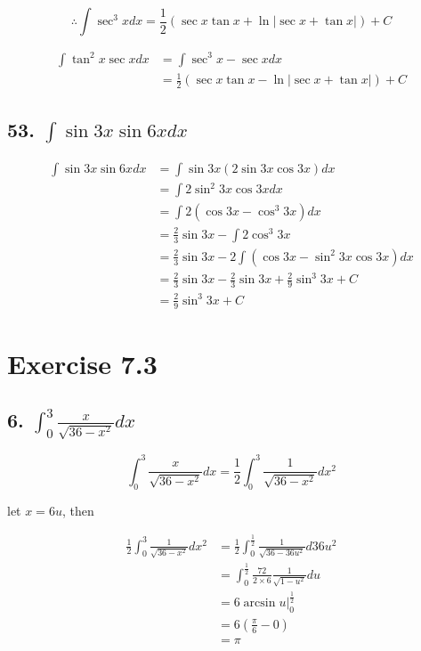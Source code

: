 \documentclass{article}
\begin{document}
    $$\therefore \int \sec^3 x dx = \frac 1 2 (\sec x \tan x + \ln |\sec x + \tan x|) + C$$

    $$\begin{aligned}
        \int \tan^2 x \sec x dx &= \int \sec ^3 x - \sec x dx \\
        &= \frac 1 2(\sec x \tan x - \ln |\sec x + \tan x|) + C
    \end{aligned}$$

    \subsection*{53. $\int \sin 3x \sin 6x dx$}

    $$\begin{aligned}
        \int \sin 3x \sin 6x dx &= \int \sin 3x(2\sin 3x \cos 3x) dx\\
        &= \int 2\sin^2 3x \cos 3x dx\\
        &= \int 2(\cos 3x - \cos ^3 3x) dx \\
        &= \frac 2 3 \sin 3x - \int 2\cos^3 3x \\
        &= \frac 2 3 \sin 3x - 2\int (\cos 3x - \sin^2 3x \cos 3x) dx \\
        &= \frac 2 3 \sin 3x - \frac 2 3 \sin 3x + \frac 2 9 \sin^3 3x + C \\
        &= \frac 2 9 \sin ^3 3x + C
    \end{aligned}$$

    \section*{Exercise 7.3}

    \subsection*{6. $\int_0^3\frac{x}{\sqrt{36 - x^2}} dx$}

    $$\int_0^3\frac{x}{\sqrt{36 - x^2}}dx = \frac 1 2 \int_0^3 \frac{1}{\sqrt{36 - x^2}}dx^2$$

    let $x = 6u$, then

    $$\begin{aligned}
        \frac 1 2 \int_0^3 \frac{1}{\sqrt{36 - x^2}}dx^2 &= \frac 1 2 \int_0^{\frac 1 2}\frac{1}{\sqrt{36 - 36u^2}} d 36u^2 \\
        &= \int_0^{\frac 1 2 }\frac{72}{2 \times 6}\frac{1}{\sqrt{1 - u^2}} du \\
        &= 6\arcsin u \biggl|_0^{\frac 1 2} \\
        &= 6(\frac \pi 6 - 0) \\
        &= \pi
    \end{aligned}$$
\end{document}
